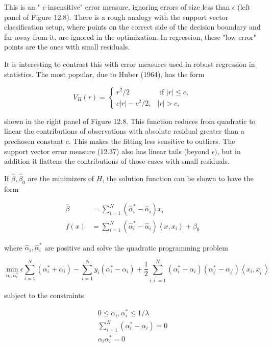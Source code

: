 \documentclass[10pt]{article}
\begin{document}
This is an " $\epsilon$-insensitive" error measure, ignoring errors of size less than $\epsilon$ (left panel of Figure 12.8). There is a rough analogy with the support vector classification setup, where points on the correct side of the decision boundary and far away from it, are ignored in the optimization. In regression, these "low error" points are the ones with small residuals.

It is interesting to contrast this with error measures used in robust regression in statistics. The most popular, due to Huber (1964), has the form

\[
V_{H}(r)= \begin{cases}r^{2} / 2 & \text { if }|r| \leq c,  \tag{12.38}\\ c|r|-c^{2} / 2, & |r|>c,\end{cases}
\]

shown in the right panel of Figure 12.8. This function reduces from quadratic to linear the contributions of observations with absolute residual greater than a prechosen constant $c$. This makes the fitting less sensitive to outliers. The support vector error measure (12.37) also has linear tails (beyond $\epsilon)$, but in addition it flattens the contributions of those cases with small residuals.

If $\hat{\beta}, \hat{\beta}_{0}$ are the minimizers of $H$, the solution function can be shown to have the form


\begin{align*}
\hat{\beta} & =\sum_{i=1}^{N}\left(\hat{\alpha}_{i}^{*}-\hat{\alpha}_{i}\right) x_{i}  \tag{12.39}\\
\hat{f}(x) & =\sum_{i=1}^{N}\left(\hat{\alpha}_{i}^{*}-\hat{\alpha}_{i}\right)\left\langle x, x_{i}\right\rangle+\beta_{0} \tag{12.40}
\end{align*}


where $\hat{\alpha}_{i}, \hat{\alpha}_{i}^{*}$ are positive and solve the quadratic programming problem

$$
\min _{\alpha_{i}, \alpha_{i}^{*}} \epsilon \sum_{i=1}^{N}\left(\alpha_{i}^{*}+\alpha_{i}\right)-\sum_{i=1}^{N} y_{i}\left(\alpha_{i}^{*}-\alpha_{i}\right)+\frac{1}{2} \sum_{i, i^{\prime}=1}^{N}\left(\alpha_{i}^{*}-\alpha_{i}\right)\left(\alpha_{i^{\prime}}^{*}-\alpha_{i^{\prime}}\right)\left\langle x_{i}, x_{i^{\prime}}\right\rangle
$$

subject to the constraints


\begin{gather*}
0 \leq \alpha_{i}, \alpha_{i}^{*} \leq 1 / \lambda \\
\sum_{i=1}^{N}\left(\alpha_{i}^{*}-\alpha_{i}\right)=0  \tag{12.41}\\
\alpha_{i} \alpha_{i}^{*}=0
\end{gather*}
\end{document}
